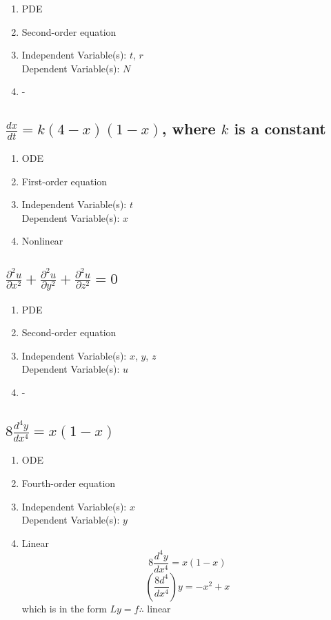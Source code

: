 \documentclass{article}
\begin{document}
\begin{enumerate}
    \item PDE
    \item Second-order equation
    \item Independent Variable(s): $ t $, $ r $ \\
          Dependent Variable(s): $ N $
    \item -
\end{enumerate}

\subsection{ $ \frac{dx}{dt} = k(4-x)(1-x) $, where $ k $ is a constant }

\begin{enumerate}
    \item ODE
    \item First-order equation
    \item Independent Variable(s): $ t $ \\
          Dependent Variable(s): $ x $
    \item Nonlinear
\end{enumerate}

\subsection{ $ \frac{\partial^2u}{\partial x^2} + \frac{\partial^2u}{\partial y^2} + \frac{\partial^2u}{\partial z^2} = 0 $ }

\begin{enumerate}
    \item PDE
    \item Second-order equation
    \item Independent Variable(s): $ x $, $ y $, $ z $ \\
          Dependent Variable(s): $ u $
    \item -
\end{enumerate}

\subsection{ $ 8\frac{d^4y}{dx^4} = x(1-x) $ }

\begin{enumerate}
    \item ODE
    \item Fourth-order equation
    \item Independent Variable(s): $ x $ \\
          Dependent Variable(s): $ y $
    \item Linear
        $$ 8\frac{d^4y}{dx^4} = x(1-x) $$
        $$ \left( \frac{8d^4}{dx^4} \right)y = -x^2 + x $$
        which is in the form $Ly = f \therefore $ linear
\end{enumerate}
\end{document}
